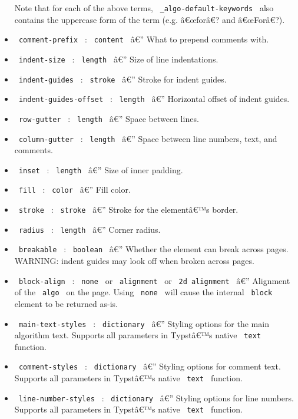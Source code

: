 \begin{itemize}
  Note that for each of the above terms,
  \texttt{\ \_algo-default-keywords\ } also contains the uppercase form
  of the term (e.g. â€œforâ€? and â€œForâ€?).
\item
  \texttt{\ comment-prefix\ } : \texttt{\ content\ } â€'' What to
  prepend comments with.
\item
  \texttt{\ indent-size\ } : \texttt{\ length\ } â€'' Size of line
  indentations.
\item
  \texttt{\ indent-guides\ } : \texttt{\ stroke\ } â€'' Stroke for
  indent guides.
\item
  \texttt{\ indent-guides-offset\ } : \texttt{\ length\ } â€''
  Horizontal offset of indent guides.
\item
  \texttt{\ row-gutter\ } : \texttt{\ length\ } â€'' Space between
  lines.
\item
  \texttt{\ column-gutter\ } : \texttt{\ length\ } â€'' Space between
  line numbers, text, and comments.
\item
  \texttt{\ inset\ } : \texttt{\ length\ } â€'' Size of inner padding.
\item
  \texttt{\ fill\ } : \texttt{\ color\ } â€'' Fill color.
\item
  \texttt{\ stroke\ } : \texttt{\ stroke\ } â€'' Stroke for the
  elementâ€™s border.
\item
  \texttt{\ radius\ } : \texttt{\ length\ } â€'' Corner radius.
\item
  \texttt{\ breakable\ } : \texttt{\ boolean\ } â€'' Whether the element
  can break across pages. WARNING: indent guides may look off when
  broken across pages.
\item
  \texttt{\ block-align\ } : \texttt{\ none\ } or \texttt{\ alignment\ }
  or \texttt{\ 2d\ alignment\ } â€'' Alignment of the \texttt{\ algo\ }
  on the page. Using \texttt{\ none\ } will cause the internal
  \texttt{\ block\ } element to be returned as-is.
\item
  \texttt{\ main-text-styles\ } : \texttt{\ dictionary\ } â€'' Styling
  options for the main algorithm text. Supports all parameters in
  Typstâ€™s native \texttt{\ text\ } function.
\item
  \texttt{\ comment-styles\ } : \texttt{\ dictionary\ } â€'' Styling
  options for comment text. Supports all parameters in Typstâ€™s native
  \texttt{\ text\ } function.
\item
  \texttt{\ line-number-styles\ } : \texttt{\ dictionary\ } â€'' Styling
  options for line numbers. Supports all parameters in Typstâ€™s native
  \texttt{\ text\ } function.
\end{itemize}

